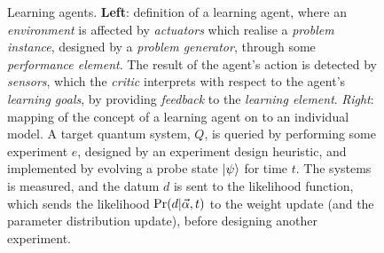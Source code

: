 \begin{figure}
\begin{minipage}[c]{0.4\textwidth}
    \end{minipage}


    \caption[Learning agents]{
        Learning agents. \textbf{Left}: definition of a learning agent, where an \emph{environment} is affected by 
        \emph{actuators} which realise a \emph{problem instance}, designed by a \emph{problem generator}, through some \emph{performance element}. 
        The result of the agent's action is detected by \emph{sensors}, which the \emph{critic} interprets with respect to
        the agent's \emph{learning goals}, by providing \emph{feedback} to the \emph{learning element}. 
        \emph{Right}: mapping of the concept of a learning agent on to an individual model. 
        A target quantum system, $Q$, is queried by performing some experiment $e$, 
        designed by an experiment design heuristic, and implemented by evolving a probe state $\ket{\psi}$ for time $t$. 
        The systems is measured, and the datum $d$ is sent to the \gls{likelihood} function, which sends the likelihood $\Pr(d|\vec{\alpha}, t)$
        to the weight update (and the parameter distribution update), before designing another experiment. 
    }
    \label{fig:learning_agent}
\end{figure}

   